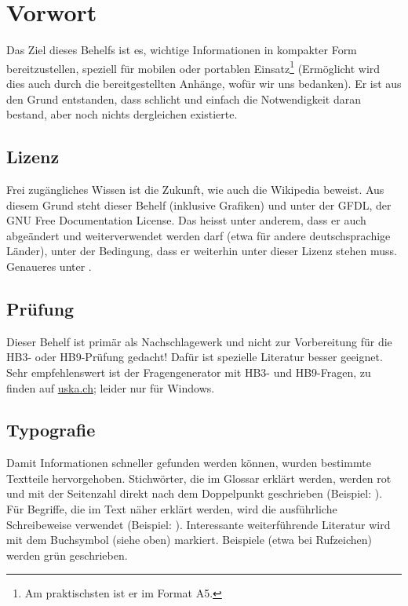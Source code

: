 \chapter{Vorwort}
Das Ziel dieses Behelfs ist es, wichtige Informationen in kompakter Form bereitzustellen, speziell für mobilen oder portablen Einsatz\footnote{Am praktischsten ist er im Format A5.} (Ermöglicht wird dies auch durch die bereitgestellten Anhänge, wofür wir uns bedanken). Er ist aus den Grund entstanden, dass schlicht und einfach die Notwendigkeit daran bestand, aber noch nichts dergleichen existierte.

\section{Lizenz}
Frei zugängliches Wissen ist die Zukunft, wie auch die Wikipedia beweist. Aus diesem Grund steht dieser Behelf (inklusive Grafiken) und unter der GFDL, der GNU Free Documentation License. Das heisst unter anderem, dass er auch abgeändert und weiterverwendet werden darf (etwa für andere deutschsprachige Länder), unter der Bedingung, dass er weiterhin unter dieser Lizenz stehen muss. Genaueres unter .

\section{Prüfung}

Dieser Behelf ist primär als Nachschlagewerk und nicht zur Vorbereitung für die HB3- oder HB9-Prüfung gedacht! Dafür ist spezielle Literatur besser geeignet. Sehr empfehlenswert ist der Fragengenerator mit HB3- und HB9-Fragen, zu finden auf \href{http://www.uska.ch}{uska.ch}; leider nur für Windows.

\section{Typografie}

Damit Informationen schneller gefunden werden können, wurden bestimmte Textteile hervorgehoben. Stichwörter, die im Glossar erklärt werden, werden rot und mit der Seitenzahl direkt nach dem Doppelpunkt geschrieben (Beispiel: ). Für Begriffe, die im Text näher erklärt werden, wird die ausführliche Schreibeweise verwendet (Beispiel: ). Interessante weiterführende Literatur wird mit dem Buchsymbol (siehe oben) markiert. Beispiele (etwa bei Rufzeichen) werden grün geschrieben.

